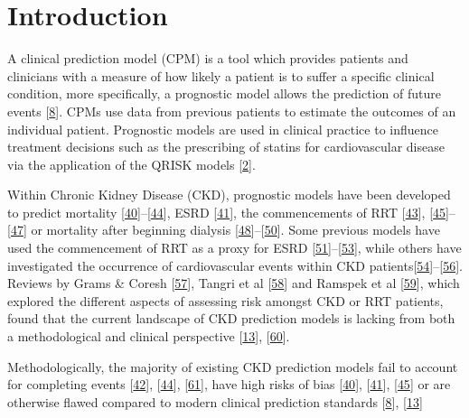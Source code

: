 \documentclass[12pt,PhD,twoside,openright]{muthesis}
\begin{document}
\hypertarget{introduction-5}{%
\section{Introduction}\label{introduction-5}}

A clinical prediction model (CPM) is a tool which provides patients and clinicians with a measure of how likely a patient is to suffer a specific clinical condition, more specifically, a prognostic model allows the prediction of future events {[}\protect\hyperlink{ref-steyerberg_prognosis_2013}{8}{]}. CPMs use data from previous patients to estimate the outcomes of an individual patient. Prognostic models are used in clinical practice to influence treatment decisions such as the prescribing of statins for cardiovascular disease via the application of the QRISK models {[}\protect\hyperlink{ref-hippisley-cox_development_2017}{2}{]}.

Within Chronic Kidney Disease (CKD), prognostic models have been developed to predict mortality {[}\protect\hyperlink{ref-johnson_predicting_2007}{40}{]}--{[}\protect\hyperlink{ref-wick_clinical_2017}{44}{]}, ESRD {[}\protect\hyperlink{ref-landray_prediction_2010}{41}{]}, the commencements of RRT {[}\protect\hyperlink{ref-marks_looking_2015}{43}{]}, {[}\protect\hyperlink{ref-johnson_predicting_2008}{45}{]}--{[}\protect\hyperlink{ref-kulkarni_transition_2017}{47}{]} or mortality after beginning dialysis {[}\protect\hyperlink{ref-floege_development_2015}{48}{]}--{[}\protect\hyperlink{ref-cao_predicting_2015}{50}{]}. Some previous models have used the commencement of RRT as a proxy for ESRD {[}\protect\hyperlink{ref-tangri_predictive_2011}{51}{]}--{[}\protect\hyperlink{ref-tangri_dynamic_2017}{53}{]}, while others have investigated the occurrence of cardiovascular events within CKD patients{[}\protect\hyperlink{ref-shlipak_cardiovascular_2005}{54}{]}--{[}\protect\hyperlink{ref-mcmurray_predictors_2011}{56}{]}. Reviews by Grams \& Coresh {[}\protect\hyperlink{ref-grams_assessing_2013}{57}{]}, Tangri et al {[}\protect\hyperlink{ref-tangri_risk_2013}{58}{]} and Ramspek et al {[}\protect\hyperlink{ref-ramspek_prediction_2017}{59}{]}, which explored the different aspects of assessing risk amongst CKD or RRT patients, found that the current landscape of CKD prediction models is lacking from both a methodological and clinical perspective {[}\protect\hyperlink{ref-collins_transparent_2015}{13}{]}, {[}\protect\hyperlink{ref-bouwmeester_reporting_2012-1}{60}{]}.

Methodologically, the majority of existing CKD prediction models fail to account for completing events {[}\protect\hyperlink{ref-bansal_development_2015}{42}{]}, {[}\protect\hyperlink{ref-wick_clinical_2017}{44}{]}, {[}\protect\hyperlink{ref-perotte_risk_2015}{61}{]}, have high risks of bias {[}\protect\hyperlink{ref-johnson_predicting_2007}{40}{]}, {[}\protect\hyperlink{ref-landray_prediction_2010}{41}{]}, {[}\protect\hyperlink{ref-johnson_predicting_2008}{45}{]} or are otherwise flawed compared to modern clinical prediction standards {[}\protect\hyperlink{ref-steyerberg_prognosis_2013}{8}{]}, {[}\protect\hyperlink{ref-collins_transparent_2015}{13}{]}
\end{document}
